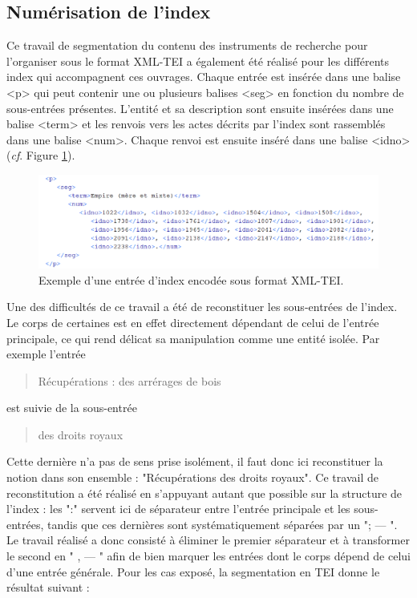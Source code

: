 \documentclass[a4paper,12pt,twoside]{book}
\begin{document}
	\subsection{Numérisation de l’index}

	Ce travail de segmentation du contenu des instruments de recherche pour l'organiser sous le format XML-TEI a également été réalisé pour les différents index qui accompagnent ces ouvrages. Chaque entrée est insérée dans une balise <p> qui peut contenir une ou plusieurs balises <seg> en fonction du nombre de sous-entrées présentes. L'entité et sa description sont ensuite insérées dans une balise <term> et les renvois vers les actes décrits par l'index sont rassemblés dans une balise <num>. Chaque renvoi est ensuite inséré dans une balise <idno> (\textit{cf}. Figure \ref{index_TEI}).
	
	\begin{figure}
		\centering
		\includegraphics[width=\textwidth]{Images/index_en_TEI.png}
		\caption{Exemple d'une entrée d'index encodée sous format XML-TEI.}
		\label{index_TEI}
	\end{figure} 
	
	Une des difficultés de ce travail a été de reconstituer les sous-entrées de l'index. Le corps de certaines est en effet directement dépendant de celui de l'entrée principale, ce qui rend délicat sa manipulation comme une entité isolée. Par exemple l'entrée
	
	\begin{quotation}
		Récupérations : des arrérages de bois
	\end{quotation}

	\noindent est suivie de la sous-entrée
	
	\begin{quotation}
		des droits royaux
	\end{quotation}

	\noindent Cette dernière n'a pas de sens prise isolément, il faut donc ici reconstituer la notion dans son ensemble : "Récupérations des droits royaux". Ce travail de reconstitution a été réalisé en s'appuyant autant que possible sur la structure de l'index : les ":" servent ici de séparateur entre l'entrée principale et les sous-entrées, tandis que ces dernières sont systématiquement séparées par un "; — ". Le travail réalisé a donc consisté à éliminer le premier séparateur et à transformer le second en " , — " afin de bien marquer les entrées dont le corps dépend de celui d'une entrée générale. Pour les cas exposé, la segmentation en TEI donne le résultat suivant :
	
\end{document}
